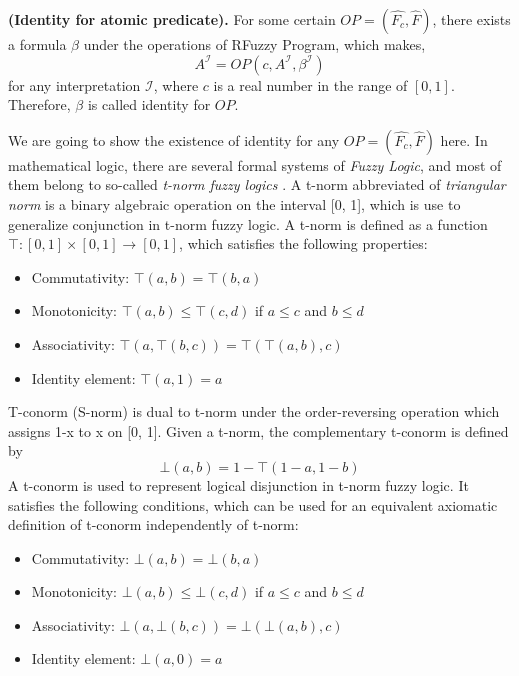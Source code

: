\begin{defin} \textbf{(Identity for atomic predicate).}
\label{def:IdentityAtomic}
For some certain $OP=(\hat{F_c},\hat{F})$, there exists a formula $\beta$ under the operations of RFuzzy Program, which makes,
\[A^{\mathcal{I}} = OP(c,A^{\mathcal{I}},\beta^{\mathcal{I}})\]
for any interpretation $\mathcal{I}$, where $c$ is a real number in the range of $[0,1]$. Therefore, $\beta$ is called identity for $OP$.
\end{defin}

We are going to show the existence of identity for any $OP=(\hat{F_c},\hat{F})$ here. In mathematical logic, there are several formal systems of \textit{Fuzzy Logic}, and most of them belong to so-called \textit{t-norm fuzzy logics} \cite{HP98}.
A t-norm abbreviated of \textit{triangular norm} is a binary algebraic operation on the interval [0, 1], which is use to generalize conjunction in t-norm fuzzy logic. A t-norm \cite{KPMRPE00} is defined as a function $\top: [0, 1]\times[0, 1]\rightarrow[0, 1]$, which satisfies the following properties:
\begin{itemize}
\item Commutativity: $\top(a, b) = \top(b, a)$
\item Monotonicity: $\top(a, b) \leq \top(c, d)$ if $a \leq c$ and $b \leq d$
\item Associativity: $\top(a, \top(b, c)) = \top(\top(a, b), c)$
\item Identity element: $\top(a, 1) = a$
\end{itemize}

T-conorm (S-norm) is dual to t-norm under the order-reversing operation which assigns 1-x to x on [0, 1]. Given a t-norm, the complementary t-conorm is defined by
\[\bot(a,b) = 1- \top(1-a,1-b)\]
A t-conorm is used to represent logical disjunction in t-norm fuzzy logic. It satisfies the following conditions, which can be used for an equivalent axiomatic definition of t-conorm independently of t-norm:
\begin{itemize}
\item Commutativity: $\bot(a, b) = \bot(b, a)$
\item Monotonicity: $\bot(a, b) \leq \bot(c, d)$ if $a \leq c$ and $b \leq d$
\item Associativity: $\bot(a, \bot(b, c)) = \bot(\bot(a, b), c)$
\item Identity element: $\bot(a, 0) = a$
\end{itemize}

